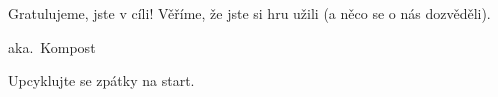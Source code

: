 %
%

%


%
%
\centerline{\topletterfont{}}
\vskip2cm
\baselineskip=55pt
{\finishfont Gratulujeme, jste v cíli! Věříme, že jste si hru užili (a něco se o nás dozvěděli).}
\footing


%
%
\centerline{\topletterfont{}}
\vskip2cm
\centerline{\kompostfont aka.\ Kompost}
\vskip2cm
\baselineskip=55pt
\centerline{\finishfont Upcyklujte se zpátky na start.}
\footing


%
%
\bye
